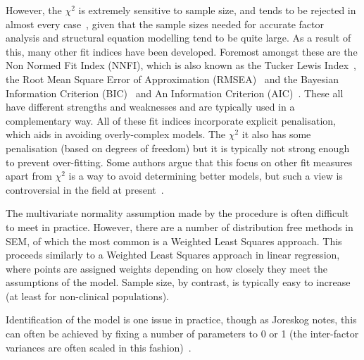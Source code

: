 However, the $\chi^2$ is extremely sensitive to sample size, and tends to be rejected in almost every case~\cite{henson2006use}, given that the sample sizes needed for accurate factor analysis and structural equation modelling tend to be quite large. As a result of this, many other fit indices have been developed. Foremost amongst these are the Non Normed Fit Index (NNFI), which is also known as the Tucker Lewis Index~\cite{bentler1990comparative}, the Root Mean Square Error of Approximation (RMSEA)~\cite{rigdon1996cfi} and the Bayesian Information Criterion (BIC)~\cite{schwarz1978estimating} and An Information Criterion (AIC)~\cite{akaike1974new}. These all have different strengths and weaknesses and are typically used in a complementary way. All of these fit indices incorporate explicit penalisation, which aids in avoiding overly-complex models. The $\chi^2$ it also has some penalisation (based on degrees of freedom) but it is typically not strong enough to prevent over-fitting. Some authors argue that this focus on other fit measures apart from $\chi^2$ is a way to avoid determining better models, but such a view is controversial in the field at present~\cite{barrett2007structural}.


The multivariate normality assumption made by the procedure is often difficult to meet in practice. However, there are a number of distribution free methods in SEM, of which the most common is a Weighted Least Squares approach. This proceeds similarly to a Weighted Least Squares approach in linear regression, where points are assigned weights depending on how closely they meet the assumptions of the model. Sample size, by contrast, is typically easy to increase (at least for non-clinical populations).

Identification of the model is one issue in practice, though as Joreskog notes, this can often be achieved by fixing a number of parameters to 0 or 1 (the inter-factor variances are often scaled in this fashion)~\cite{joreskog1978structural}.

